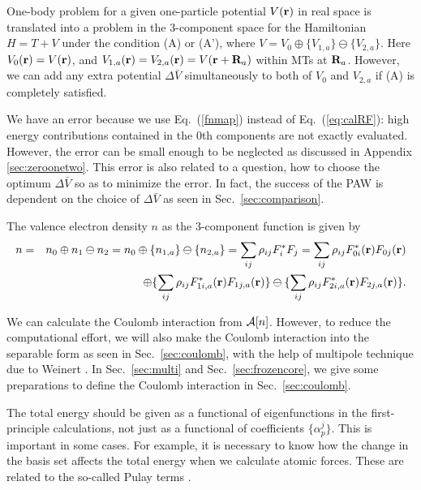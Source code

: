 \documentclass[twocolumn,showpacs,preprintnumbers,amsmath,amssymb,floatfix]{revtex4-1}
\newcommand{\bfr}{{\bf r}}
\newcommand{\bfR}{{\bf R}}
\newcommand{\ooplus}{\oplus}
\newcommand{\oominus}{\ominus}
\def\calR{{\cal A}}
\newcommand{\req}[1]{\mbox{Eq.~\!(\ref{#1})}}
\newcommand{\refsec}[1]{\mbox{Sec.~\!\ref{#1}}}
\def\rhoij{\rho_{ij}}
\begin{document}
\begin{widetext}
One-body problem for a given one-particle potential $V(\bfr)$ in real
space is translated into a problem in the 3-component space for the
Hamiltonian $H=T+V$ under the condition (A) or (A'), where $V=V_0 \oplus
\{V_{1,a}\} \ominus \{V_{2,a}\}$.  Here $V_0(\bfr)=V(\bfr)$, and
$V_{1,a}(\bfr)=V_{2,a}(\bfr)=V(\bfr+\bfR_a)$ within MTs at
$\bfR_a$. However, we can add any extra potential $\Delta \bar{V}$
simultaneously to both of $V_0$ and $V_{2,a}$ if (A) is completely
satisfied.

We have an error because we use \req{fnmap} instead of \req{eq:calRF}:
high energy contributions contained in the 0th components are not
exactly evaluated. However, the error can be small enough to be
neglected as discussed in Appendix \ref{sec:zeroonetwo}.  This error is
also related to a question, how to choose the optimum $\Delta \bar{V}$
so as to minimize the error.  In fact, the success of the PAW \cite{PAW}
is dependent on the choice of $\Delta \bar{V}$ as seen in
\refsec{sec:comparison}.

The valence electron density $n$ as the 3-component function is given by
\begin{eqnarray}
n &=&n_0\ooplus n_1 \oominus n_2 = n_0 \ooplus \{n_{1,a}\} \oominus \{n_{2,a}\} =
\sum_{ij} \rhoij F_i^* F_j = \sum_{ij}
 \rhoij F^*_{0i}(\bfr)F_{0j}(\bfr) \nonumber \\
&&\ooplus  \{ \sum_{ij} \rhoij F^*_{1i,a}(\bfr)F_{1j,a}(\bfr) \}
\oominus   \{ \sum_{ij} \rhoij F^*_{2i,a}(\bfr)F_{2j,a}(\bfr) \}. \label{eq:n}
\end{eqnarray}
\end{widetext}
We can calculate the Coulomb interaction from $\calR[n]$. 
However, to reduce the computational effort, 
we will also make the Coulomb interaction into the separable form as
seen in \refsec{sec:coulomb}, with the help of multipole technique
due to Weinert \cite{weinert81}.
In \refsec{sec:multi} and \refsec{sec:frozencore}, we give some
preparations to define the Coulomb interaction in \refsec{sec:coulomb}.

The total energy should be given as a functional of eigenfunctions in
the first-principle calculations, not just as a functional of
coefficients $\{\alpha^j_p\}$.  This is important in some cases. For
example, it is necessary to know how the change in the basis set affects
the total energy when we calculate atomic forces. These are related to
the so-called Pulay terms \cite{pulay69}.
\end{document}
